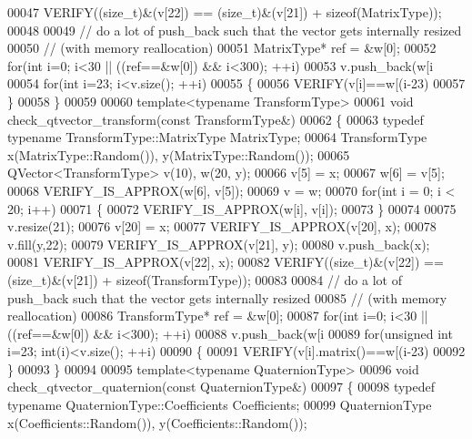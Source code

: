 \begin{DoxyCode}
00047   VERIFY((\textcolor{keywordtype}{size\_t})&(v[22]) == (\textcolor{keywordtype}{size\_t})&(v[21]) + \textcolor{keyword}{sizeof}(MatrixType));
00048 
00049   \textcolor{comment}{// do a lot of push\_back such that the vector gets internally resized}
00050   \textcolor{comment}{// (with memory reallocation)}
00051   MatrixType* ref = &w[0];
00052   \textcolor{keywordflow}{for}(\textcolor{keywordtype}{int} i=0; i<30 || ((ref==&w[0]) && i<300); ++i)
00053     v.push\_back(w[i%
00054   \textcolor{keywordflow}{for}(\textcolor{keywordtype}{int} i=23; i<v.size(); ++i)
00055   \{
00056     VERIFY(v[i]==w[(i-23)%
00057   \}
00058 \}
00059 
00060 \textcolor{keyword}{template}<\textcolor{keyword}{typename} TransformType>
00061 \textcolor{keywordtype}{void} check\_qtvector\_transform(\textcolor{keyword}{const} TransformType&)
00062 \{
00063   \textcolor{keyword}{typedef} \textcolor{keyword}{typename} TransformType::MatrixType MatrixType;
00064   TransformType x(MatrixType::Random()), y(MatrixType::Random());
00065   QVector<TransformType> v(10), w(20, y);
00066   v[5] = x;
00067   w[6] = v[5];
00068   VERIFY\_IS\_APPROX(w[6], v[5]);
00069   v = w;
00070   \textcolor{keywordflow}{for}(\textcolor{keywordtype}{int} i = 0; i < 20; i++)
00071   \{
00072     VERIFY\_IS\_APPROX(w[i], v[i]);
00073   \}
00074 
00075   v.resize(21);
00076   v[20] = x;
00077   VERIFY\_IS\_APPROX(v[20], x);
00078   v.fill(y,22);
00079   VERIFY\_IS\_APPROX(v[21], y);
00080   v.push\_back(x);
00081   VERIFY\_IS\_APPROX(v[22], x);
00082   VERIFY((\textcolor{keywordtype}{size\_t})&(v[22]) == (\textcolor{keywordtype}{size\_t})&(v[21]) + \textcolor{keyword}{sizeof}(TransformType));
00083 
00084   \textcolor{comment}{// do a lot of push\_back such that the vector gets internally resized}
00085   \textcolor{comment}{// (with memory reallocation)}
00086   TransformType* ref = &w[0];
00087   \textcolor{keywordflow}{for}(\textcolor{keywordtype}{int} i=0; i<30 || ((ref==&w[0]) && i<300); ++i)
00088     v.push\_back(w[i%
00089   \textcolor{keywordflow}{for}(\textcolor{keywordtype}{unsigned} \textcolor{keywordtype}{int} i=23; int(i)<v.size(); ++i)
00090   \{
00091     VERIFY(v[i].matrix()==w[(i-23)%
00092   \}
00093 \}
00094 
00095 \textcolor{keyword}{template}<\textcolor{keyword}{typename} QuaternionType>
00096 \textcolor{keywordtype}{void} check\_qtvector\_quaternion(\textcolor{keyword}{const} QuaternionType&)
00097 \{
00098   \textcolor{keyword}{typedef} \textcolor{keyword}{typename} QuaternionType::Coefficients Coefficients;
00099   QuaternionType x(Coefficients::Random()), y(Coefficients::Random());

\end{DoxyCode}
